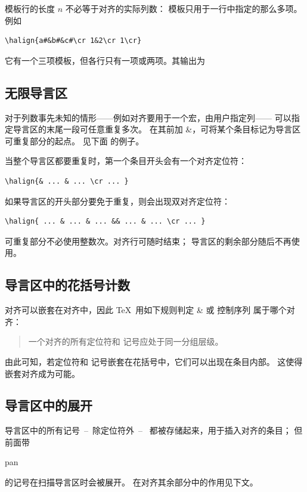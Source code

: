 \documentclass[a4paper]{rapport3}
\makeatletter
\def\ldash{\unskip\ --\nobreak\ \ignorespaces}
\def\rdash{\unskip\nobreak\ --\ \ignorespaces}
\newenvironment{disp}{\begin{quotation}}{\end{quotation}}
\def\cstoidx#1\par{\index{#1@\cs{#1}}}
\def\csidx#1{\cstoidx #1\par\cs{#1}}
\makeatother
\begin{document}
模板行的长度 $n$ 不必等于对齐的实际列数：
模板只用于一行中指定的那么多项。例如
\begin{verbatim}
\halign{a#&b#&c#\cr 1&2\cr 1\cr}
\end{verbatim}
它有一个三项模板，但各行只有一项或两项。其输出为
\begin{disp}\leavevmode\vbox{}\end{disp}

\subsection{无限导言区}

对于列数事先未知的情形——例如对齐要用于一个宏，由用户指定列——
可以指定导言区的末尾一段可任意重复多次。
在其前加 \n\&，可将某个条目标记为导言区可重复部分的起点。
见下面  的例子。

当整个导言区都要重复时，第一个条目开头会有一个对齐定位符：
\begin{verbatim}
\halign{& ... & ... \cr ... }
\end{verbatim}
如果导言区的开头部分要免于重复，则会出现双对齐定位符：
\begin{verbatim}
\halign{ ... & ... & ... && ... & ... \cr ... }
\end{verbatim}

可重复部分不必使用整数次。对齐行可随时结束；
导言区的剩余部分随后不再使用。

\subsection{导言区中的花括号计数}

对齐可以嵌套在对齐中，因此 \TeX\ 用如下规则判定 \n\& 或  控制序列
属于哪个对齐：
\begin{disp} 一个对齐的所有定位符和  记号应处于同一分组层级。\end{disp}
由此可知，若定位符和  记号嵌套在花括号中，它们可以出现在条目内部。
这使得嵌套对齐成为可能。

\subsection{导言区中的展开}

导言区中的所有记号\ldash 除定位符外\rdash
都被存储起来，用于插入对齐的条目；
但前面带 \csidx{span} 的记号在扫描导言区时会被展开。
 在对齐其余部分中的作用见下文。
\end{document}
